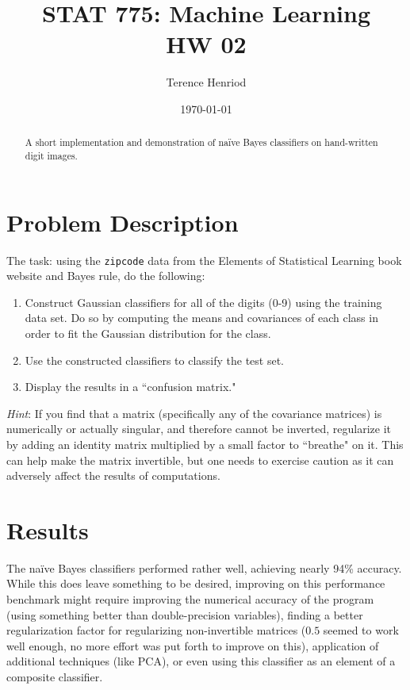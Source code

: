 \documentclass{article}
\title{STAT 775: Machine Learning \\ HW 02}
\author{Terence Henriod}
\date{\today}
\begin{document}
\clearpage            %
\maketitle            %
\thispagestyle{empty} %

\begin{abstract}
A short implementation and demonstration of na\"{i}ve Bayes classifiers on hand-written digit images.
\end{abstract}

\newpage
\section{Problem Description}
The task: using the \texttt{zipcode} data from the Elements of Statistical Learning book website and Bayes rule, do the following:
\begin{enumerate}
  \item Construct Gaussian classifiers for all of the digits (0-9) using the training data set. Do so by computing the means and covariances of each class in order to fit the Gaussian distribution for the class.
  \item Use the constructed classifiers to classify the test set.
  \item Display the results in a ``confusion matrix."
\end{enumerate}
\textit{Hint}: If you find that a matrix (specifically any of the covariance matrices) is numerically or actually singular, and therefore cannot be inverted, regularize it by adding an identity matrix multiplied by a small factor to ``breathe" on it. This can help make the matrix invertible, but one needs to exercise caution as it can adversely affect the results of computations.

\section{Results}
The na\"{i}ve Bayes classifiers performed rather well, achieving nearly 94\% accuracy. While this does leave something to be desired, improving on this performance benchmark might require improving the numerical accuracy of the program (using something better than double-precision variables), finding a better regularization factor for regularizing non-invertible matrices ($0.5$ seemed to work well enough, no more effort was put forth to improve on this), application of additional techniques (like PCA), or even using this classifier as an element of a composite classifier.
\end{document}
